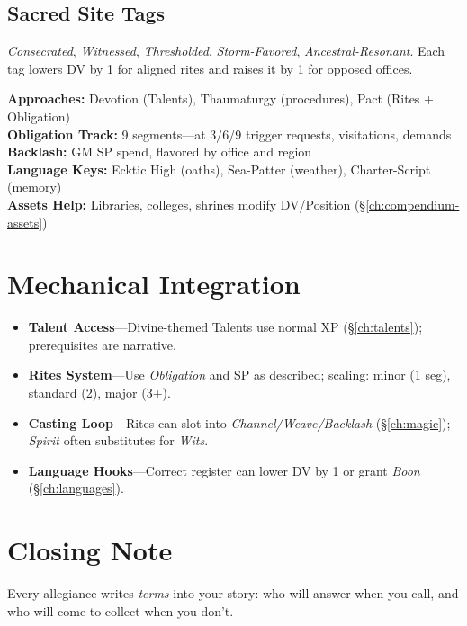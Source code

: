 \begin{multicols}{2}
\subsection*{Sacred Site Tags}
\textit{Consecrated}, \textit{Witnessed}, \textit{Thresholded}, \textit{Storm-Favored}, \textit{Ancestral-Resonant}. Each tag lowers DV by 1 for aligned rites and raises it by 1 for opposed offices.

\begin{tcolorbox}[colback=purple!5!white,colframe=purple!75!black,title=Divine \& Patron Quick Reference,fonttitle=\bfseries]
\textbf{Approaches:} Devotion (Talents), Thaumaturgy (procedures), Pact (Rites + Obligation) \\
\textbf{Obligation Track:} 9 segments—at 3/6/9 trigger requests, visitations, demands \\
\textbf{Backlash:} GM SP spend, flavored by office and region \\
\textbf{Language Keys:} Ecktic High (oaths), Sea-Patter (weather), Charter-Script (memory) \\
\textbf{Assets Help:} Libraries, colleges, shrines modify DV/Position (\S\ref{ch:compendium-assets})
\end{tcolorbox}

\section{Mechanical Integration}
\begin{itemize}
  \item \textbf{Talent Access}—Divine-themed Talents use normal XP (\S\ref{ch:talents}); prerequisites are narrative.
  \item \textbf{Rites System}—Use \emph{Obligation} and SP as described; scaling: minor (1 seg), standard (2), major (3+).
  \item \textbf{Casting Loop}—Rites can slot into \emph{Channel/Weave/Backlash} (\S\ref{ch:magic}); \emph{Spirit} often substitutes for \emph{Wits}.
  \item \textbf{Language Hooks}—Correct register can lower DV by 1 or grant \emph{Boon} (\S\ref{ch:languages}).
\end{itemize}

\section*{Closing Note}
Every allegiance writes \emph{terms} into your story: who will answer when you call, and who will come to collect when you don’t.

\end{multicols}
